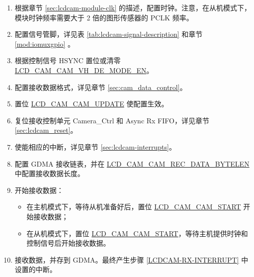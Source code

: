 \documentclass[main\_\_CN.tex]{subfiles}
\begin{document}
\begin{enumerate}
    \item 根据章节 \ref{sec:lcdcam-module-clk} 的描述，配置时钟。注意，在从机模式下，模块时钟频率需要大于 2 倍的图形传感器的 PCLK 频率。

    \item 配置信号管脚，详见表 \ref{tab:lcdcam-signal-description} 和章节 \ref{mod:iomuxgpio} \textit{}。

    \item 根据控制信号 HSYNC 置位或清零 \hyperref[fielddesc:LCDCAMCAMVHDEMODEEN]{LCD\_CAM\_CAM\_VH\_DE\_MODE\_EN}。

    \item 配置接收数据格式，详见章节 \ref{sec:cam_data_control}。

    \item 置位 \hyperref[fielddesc:LCDCAMCAMUPDATE]{LCD\_CAM\_CAM\_UPDATE} 使配置生效。

    \item 复位接收控制单元 Camera\_Ctrl 和 Async Rx FIFO，详见章节 \ref{sec:lcdcam_reset}。

    \item 使能相应的中断，详见章节 \ref{sec:lcdcam-interrupts}。\label{LCDCAM-RX-INTERRUPT}

    \item 配置 GDMA 接收链表，并在 \hyperref[fielddesc:LCDCAMCAMRECDATABYTELEN]{LCD\_CAM\_CAM\_REC\_DATA\_BYTELEN} 中配置接收数据长度。

    \item 开始接收数据：
    \begin{itemize}
        \item 在主机模式下，等待从机准备好后，置位 \hyperref[fielddesc:LCDCAMCAMSTART]{LCD\_CAM\_CAM\_START} 开始接收数据；
        \item 在从机模式下，置位 \hyperref[fielddesc:LCDCAMCAMSTART]{LCD\_CAM\_CAM\_START}，等待主机提供时钟和控制信号后开始接收数据。
    \end{itemize}
    \item 接收数据，并存到 GDMA。最终产生步骤 \ref{LCDCAM-RX-INTERRUPT} 中设置的中断。
\end{enumerate}
\end{document}
